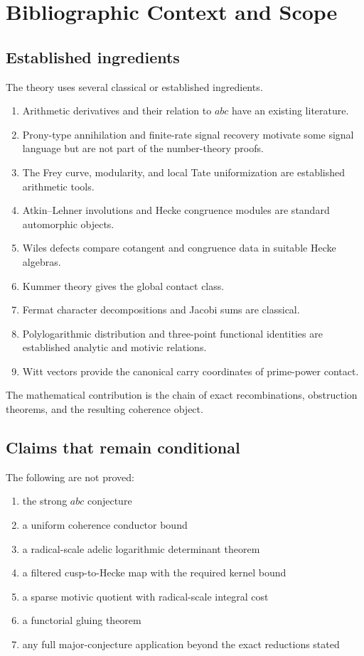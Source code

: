 \chapter{Bibliographic Context and Scope}

\section{Established ingredients}
The theory uses several classical or established ingredients.

\begin{enumerate}[leftmargin=1.5em]
\item Arithmetic derivatives and their relation to $abc$ have an existing literature.
\item Prony-type annihilation and finite-rate signal recovery motivate some signal language but are not part of the number-theory proofs.
\item The Frey curve, modularity, and local Tate uniformization are established arithmetic tools.
\item Atkin--Lehner involutions and Hecke congruence modules are standard automorphic objects.
\item Wiles defects compare cotangent and congruence data in suitable Hecke algebras.
\item Kummer theory gives the global contact class.
\item Fermat character decompositions and Jacobi sums are classical.
\item Polylogarithmic distribution and three-point functional identities are established analytic and motivic relations.
\item Witt vectors provide the canonical carry coordinates of prime-power contact.
\end{enumerate}

The mathematical contribution is the chain of exact recombinations, obstruction theorems, and the resulting coherence object.

\section{Claims that remain conditional}
The following are not proved:

\begin{enumerate}[leftmargin=1.5em]
\item the strong $abc$ conjecture
\item a uniform coherence conductor bound
\item a radical-scale adelic logarithmic determinant theorem
\item a filtered cusp-to-Hecke map with the required kernel bound
\item a sparse motivic quotient with radical-scale integral cost
\item a functorial gluing theorem
\item any full major-conjecture application beyond the exact reductions stated
\end{enumerate}

